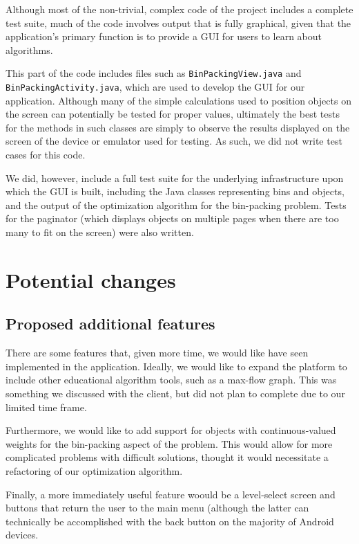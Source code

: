 \documentclass[11pt]{article}
\begin{document}
Although most of the non-trivial, complex code of the project includes a
complete test suite, much of the code involves output that is fully graphical,
given that the application's primary function is to provide a GUI for users to
learn about algorithms.

This part of the code includes files such as \texttt{BinPackingView.java} and
\texttt{BinPackingActivity.java}, which are used to develop the GUI for our
application.  Although many of the simple calculations used to position objects
on the screen can potentially be tested for proper values, ultimately the best
tests for the methods in such classes are simply to observe the results
displayed on the screen of the device or emulator used for testing.  As such,
we did not write test cases for this code.

We did, however, include a full test suite for the underlying infrastructure
upon which the GUI is built, including the Java classes representing bins and
objects, and the output of the optimization algorithm for the bin-packing
problem.  Tests for the paginator (which displays objects on multiple pages
when there are too many to fit on the screen) were also written.

\section{Potential changes}

\subsection{Proposed additional features}

There are some features that, given more time, we would like have seen
implemented in the application.  Ideally, we would like to expand the platform
to include other educational algorithm tools, such as a max-flow graph.  This
was something we discussed with the client, but did not plan to complete due to
our limited time frame.

Furthermore, we would like to add support for objects with continuous-valued
weights for the bin-packing aspect of the problem.  This would allow for more
complicated problems with difficult solutions, thought it would necessitate a
refactoring of our optimization algorithm.

Finally, a more immediately useful feature woould be a level-select screen
and buttons that return the user to the main menu (although the latter can
technically be accomplished with the back button on the majority of Android
devices.
\end{document}
